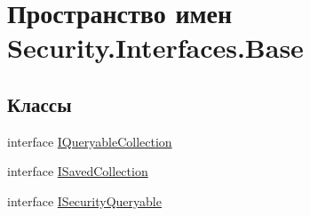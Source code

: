 \hypertarget{namespace_security_1_1_interfaces_1_1_base}{}\section{Пространство имен Security.\+Interfaces.\+Base}
\label{namespace_security_1_1_interfaces_1_1_base}
\subsection*{Классы}
\begin{DoxyCompactItemize}
\item 
interface \hyperlink{interface_security_1_1_interfaces_1_1_base_1_1_i_queryable_collection}{I\+Queryable\+Collection}
\item 
interface \hyperlink{interface_security_1_1_interfaces_1_1_base_1_1_i_saved_collection}{I\+Saved\+Collection}
\item 
interface \hyperlink{interface_security_1_1_interfaces_1_1_base_1_1_i_security_queryable}{I\+Security\+Queryable}
\end{DoxyCompactItemize}
